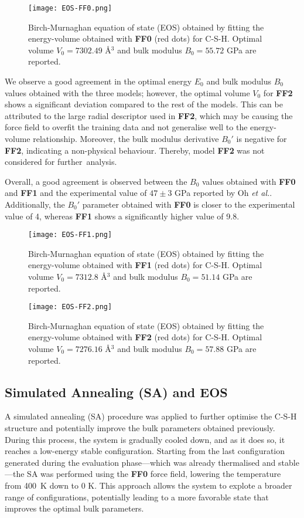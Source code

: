 \begin{figure}[h!]
    \centering
    \texttt{[image: EOS-FF0.png]}
    \caption{Birch-Murnaghan equation of state (EOS) obtained by fitting the energy-volume obtained with \textbf{FF0} (red dots) for C-S-H. Optimal volume $V_0=7302.49$ \AA$^3$ and bulk modulus $B_0=55.72$ GPa are reported.
    }
    \label{fig:eos-ff0}
\end{figure}

We observe a good agreement in the optimal energy $E_0$ and bulk modulus $B_0$ values obtained with the three models; however, the optimal volume $V_0$ for \textbf{FF2} shows a significant deviation compared to the rest of the models. This can be attributed to the large radial descriptor used in \textbf{FF2}, which may be causing the force field to overfit the training data and not generalise well to the energy-volume relationship. Moreover, the bulk modulus derivative $B_0'$ is negative for \textbf{FF2}, indicating a non-physical behaviour. Thereby, model \textbf{FF2} was not considered for further~analysis. 

Overall, a good agreement is observed between the $B_0$ values obtained with \textbf{FF0} and \textbf{FF1} and the experimental value of $47\pm 3$ GPa reported by Oh \emph{et al.}\supercite{Oh2012}. Additionally, the $B_0'$ parameter obtained with \textbf{FF0} is closer to the experimental value of 4\supercite{Oh2012}, whereas \textbf{FF1} shows a significantly higher value of 9.8. 
\begin{figure}[h!]
    \centering
    \texttt{[image: EOS-FF1.png]}
    \caption{
    Birch-Murnaghan equation of state (EOS) obtained by fitting the energy-volume obtained with \textbf{FF1} (red dots) for C-S-H. Optimal volume $V_0=7312.8$ \AA$^3$ and bulk modulus $B_0=51.14$ GPa are reported.
    }
    \label{fig:eos-ff1}
\end{figure}
\begin{figure}[H]
    \centering
    \texttt{[image: EOS-FF2.png]}
    \caption{
    Birch-Murnaghan equation of state (EOS) obtained by fitting the energy-volume obtained with \textbf{FF2} (red dots) for C-S-H. Optimal volume $V_0=7276.16$ \AA$^3$ and bulk modulus $B_0=57.88$ GPa are reported.}
    \label{fig:eos-ff2}
\end{figure}

\subsection{Simulated Annealing (SA) and EOS}
A simulated annealing (SA) procedure was applied to further optimise the C-S-H structure and potentially improve the bulk parameters obtained previously. During this process, the system is gradually cooled down, and as it does so, it reaches a low-energy stable configuration. Starting from the last configuration generated during the evaluation phase---which was already thermalised and stable---the SA was performed using the \textbf{FF0} force field, lowering the temperature from 400~K down to 0 K. This approach allows the system to explote a broader range of configurations, potentially leading to a more favorable state that improves the optimal bulk parameters.

